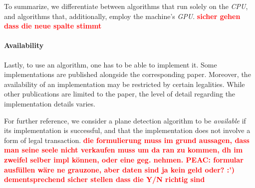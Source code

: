 \documentclass[main.tex]{subfiles}
\begin{document}
To summarize, we differentiate between algorithms that run solely on the \textit{CPU}, and algorithms that, additionally, employ the
machine's \textit{GPU}.
\textbf{\textcolor{red}{sicher gehen dass die neue spalte stimmt}}
\paragraph{Availability}
Lastly, to use an algorithm, one has to be able to implement it. Some implementations are published alongside the corresponding paper.
Moreover, the availability of an implementation may be restricted by certain legalities.
While other publications are limited to the paper, the level of detail regarding the implementation details varies.

For further reference, we consider a plane detection algorithm to be \textit{available} if its implementation is successful, and
that the implementation does not involve a form of legal transaction.
\textbf{\textcolor{red}{die formulierung muss im grund aussagen, dass man seine seele nicht verkaufen muss um da ran zu kommen, dh
        im zweifel selber impl können, oder eine geg. nehmen. PEAC: formular ausfüllen wäre ne grauzone, aber daten sind ja kein geld oder? :')}}
\textbf{\textcolor{red}{dementsprechend sicher stellen dass die Y/N richtig sind}}
\end{document}
